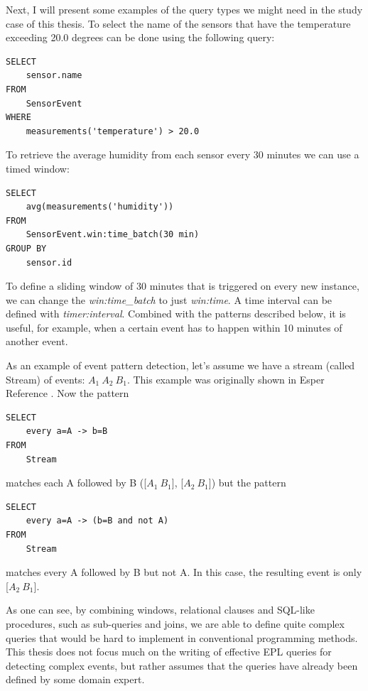 Next, I will present some examples of the query types we might need in the study case of this thesis. To select the name of the sensors that have the temperature exceeding 20.0 degrees can be done using the following query:

\begin{Verbatim}[xleftmargin=1.5em]
SELECT 
	sensor.name 
FROM 
	SensorEvent 
WHERE 
	measurements('temperature') > 20.0
\end{Verbatim}

To retrieve the average humidity from each sensor every 30 minutes we can use a timed window:
\begin{Verbatim}[xleftmargin=1.5em]
SELECT 
	avg(measurements('humidity')) 
FROM 
	SensorEvent.win:time_batch(30 min) 
GROUP BY 
	sensor.id
\end{Verbatim}

To define a sliding window of 30 minutes that is triggered on every new instance, we can change the \emph{win:time\_batch} to just \emph{win:time}. A time interval can be defined with \emph{timer:interval}. Combined with the patterns described below, it is useful, for example, when a certain event has to happen within 10 minutes of another event.


As an example of event pattern detection, let's assume we have a stream (called Stream) of events: $A_1 \ A_2 \ B_1$. This example was originally shown in Esper Reference \cite{EsperReference}. Now the pattern

\begin{Verbatim}[xleftmargin=1.5em]
SELECT 
	every a=A -> b=B 
FROM 
	Stream
\end{Verbatim}
matches each A followed by B ([$A_1 \ B_1$], [$A_2 \ B_1$]) but the pattern

\begin{Verbatim}[xleftmargin=1.5em]
SELECT 
	every a=A -> (b=B and not A) 
FROM
	Stream
\end{Verbatim}

matches every A followed by B but not A. In this case, the resulting event is only [$A_2 \ B_1$].


As one can see, by combining windows, relational clauses and SQL-like procedures, such as sub-queries and joins, we are able to define quite complex queries that would be hard to implement in conventional programming methods. This thesis does not focus much on the writing of effective EPL queries for detecting complex events, but rather assumes that the queries have already been defined by some domain expert. 

